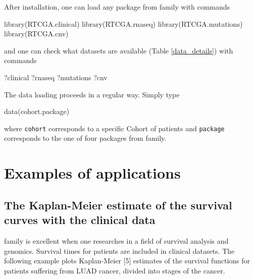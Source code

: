 After installation, one can load any package from 
family with commands

\begin{Schunk}
\begin{Sinput}
library(RTCGA.clinical)
library(RTCGA.rnaseq)
library(RTCGA.mutations)
library(RTCGA.cnv)
\end{Sinput}
\end{Schunk}

and one can check what datasets are available (Table \ref{data_details})
with commands

\begin{Schunk}
\begin{Sinput}
?clinical
?rnaseq
?mutations
?cnv
\end{Sinput}
\end{Schunk}

The data loading proceeds in a regular way. Simply type

\begin{Schunk}
\begin{Sinput}
data(cohort.package)
\end{Sinput}
\end{Schunk}

where \texttt{cohort} corresponds to a specific Cohort of patients and
\texttt{package} corresponds to the one of four packages from
 family.

\newpage

\section{Examples of applications}\label{examples-of-applications}

\subsection{The Kaplan-Meier estimate of the survival curves with the
clinical
data}\label{the-kaplan-meier-estimate-of-the-survival-curves-with-the-clinical-data}

 family is excellent when one researches in a field of
survival analysis and genomics. Survival times for patients are included
in clinical datasets. The following example plots Kaplan-Meier {[}5{]}
estimates of the survival functions for patients suffering from LUAD
cancer, divided into stages of the cancer.

